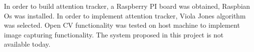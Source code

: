 In order to build attention tracker, a Raspberry PI board was obtained, Raspbian Os was installed. In order to implement attention tracker, Viola Jones algorithm was selected. Open CV functionality was tested on host machine to implement image capturing functionality. The system proposed in this project is not available today. 
